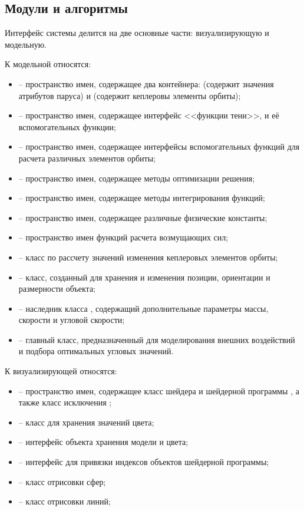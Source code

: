 \subsection{Модули и алгоритмы}
\noindent\indent Интерфейс системы делится на две основные части: визуализирующую и
модельную.\par
    К модельной относятся:
\begin{itemize}
    \item {} -- пространство имен, содержащее два контейнера:
     (содержит значения атрибутов паруса) и
     (содержит кеплеровы элементы орбиты);
    \item {} -- пространство имен, содержащее интерфейс <<функции тени>>,
    и её вспомогательных функции;
    \item {} -- пространство имен, содержащее интерфейсы вспомогательных
    функций для расчета различных элементов орбиты;
    \item {} -- пространство имен, содержащее методы оптимизации
    решения;
    \item {} -- пространство имен, содержащее методы интегрирования
    функций;
    \item {} -- пространство имен, содержащее различные физические
    константы;
    \item {} -- пространство имен функций расчета возмущающих сил;
    \item {} -- класс по рассчету значений изменения кеплеровых
    элементов орбиты;
    \item {} -- класс, созданный для хранения и изменения
    позиции, ориентации и размерности объекта;
    \item {} -- наследник класса , содержащий дополнительные
    параметры массы, скорости и угловой скорости;
    \item {} -- главный класс, предназначенный для
    моделирования внешних воздействий и подбора оптимальных угловых значений.
\end{itemize}
    К визуализирующей относятся:
\begin{itemize}
    \item {} -- пространство имен, содержащее класс шейдера  и
    шейдерной программы , а также класс исключения ;
    \item {} -- класс для хранения значений цвета;
    \item {} -- интерфейс объекта хранения модели и цвета;
    \item {} -- интерфейс для привязки индексов объектов шейдерной
    программы;
    \item {} -- класс отрисовки сфер;
    \item {} -- класс отрисовки линий;
\end{itemize}
